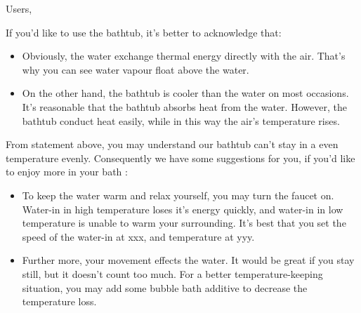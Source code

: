 \documentclass[12pt,a4paper,titlepage]{article}
\begin{document}
Users,

If you'd like to use the bathtub, it's better to acknowledge that:

\begin{itemize}
\item Obviously, the water exchange thermal energy directly with the air. That's why you can see water vapour float above the water.
\item On the other hand, the bathtub is cooler than the water on most occasions. It's reasonable that the bathtub absorbs heat from the water. However, the bathtub conduct heat easily, while in this way the air's temperature rises.
\end{itemize}
From statement above, you may understand our bathtub can't stay in a even temperature evenly. Consequently we have some suggestions for you, if you'd like to enjoy more in your bath :
\begin{itemize}
\item To keep the water warm and relax yourself, you may turn the faucet on. Water-in in high temperature loses it's energy quickly, and water-in in low temperature is unable to warm your surrounding. It's best that you set the speed of the water-in at xxx, and temperature at yyy.
\item Further more, your movement effects the water. It would be great if you stay still, but it doesn't count too much. For a better temperature-keeping situation, you may add some bubble bath additive to decrease the temperature loss.
\end{itemize}
\end{document}

